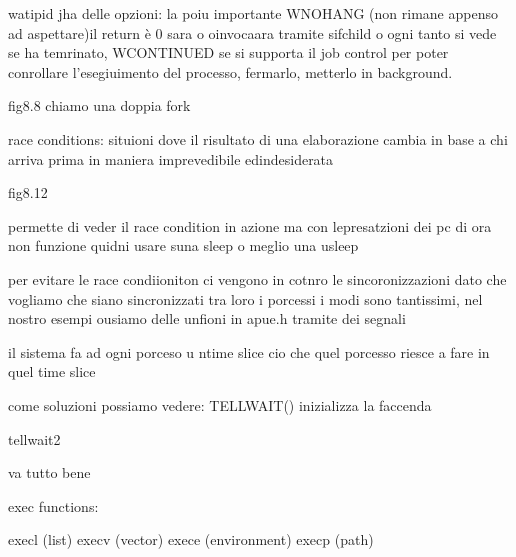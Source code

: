 watipid jha delle opzioni: la poiu importante WNOHANG (non rimane appenso ad aspettare)il return è 0 sara o oinvocaara tramite sifchild o ogni tanto si vede se ha temrinato, WCONTINUED se si supporta il job control per poter conrollare l'esegiuimento del processo, fermarlo, metterlo in background.


fig8.8 chiamo una doppia fork





race conditions:
situioni dove il risultato di una elaborazione cambia in base a chi arriva prima in maniera imprevedibile edindesiderata

fig8.12

permette di veder il race condition in azione ma con lepresatzioni dei pc di ora non funzione quidni usare suna sleep o meglio una usleep

per evitare le race condiioniton ci vengono in cotnro le sincoronizzazioni dato che vogliamo che siano sincronizzati tra loro i porcessi
i modi sono tantissimi, nel nostro esempi ousiamo delle unfioni in apue.h tramite dei segnali 


il sistema fa ad ogni porceso u ntime slice cio che quel porcesso riesce a fare in quel time slice 

come soluzioni possiamo vedere:
TELLWAIT() inizializza la faccenda


tellwait2

va tutto bene






exec functions:

execl (list)
execv (vector)
exece (environment)
execp (path)


